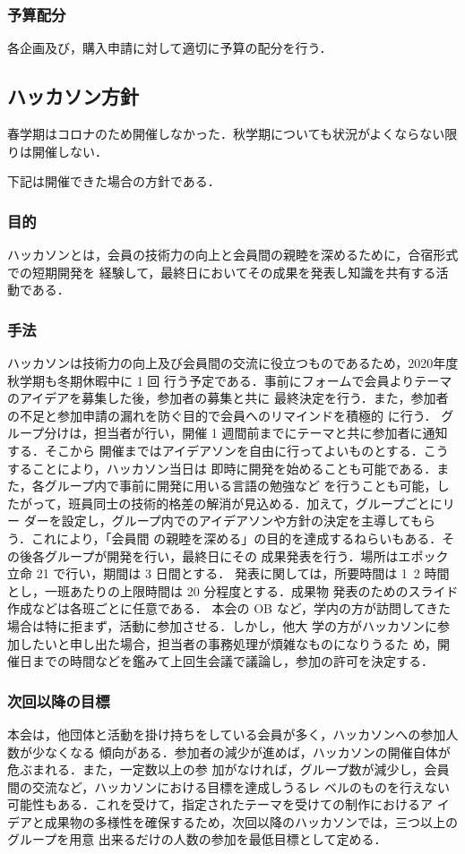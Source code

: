 \subsubsection*{予算配分}
各企画及び，購入申請に対して適切に予算の配分を行う．


\subsection*{ハッカソン方針}
春学期はコロナのため開催しなかった．秋学期についても状況がよくならない限りは開催しない．

下記は開催できた場合の方針である．

\subsubsection*{目的}
ハッカソンとは，会員の技術力の向上と会員間の親睦を深めるために，合宿形式での短期開発を
経験して，最終日においてその成果を発表し知識を共有する活動である．

\subsubsection*{手法}
ハッカソンは技術力の向上及び会員間の交流に役立つものであるため，2020年度秋学期も冬期休暇中に 1 回
行う予定である．事前にフォームで会員よりテーマのアイデアを募集した後，参加者の募集と共に
最終決定を行う．また，参加者の不足と参加申請の漏れを防ぐ目的で会員へのリマインドを積極的
に行う．
グループ分けは，担当者が行い，開催 1 週間前までにテーマと共に参加者に通知する．そこから
開催まではアイデアソンを自由に行ってよいものとする．こうすることにより，ハッカソン当日は
即時に開発を始めることも可能である．また，各グループ内で事前に開発に用いる言語の勉強など
を行うことも可能，したがって，班員同士の技術的格差の解消が見込める．加えて，グループごとにリー
ダーを設定し，グループ内でのアイデアソンや方針の決定を主導してもらう．これにより，「会員間
の親睦を深める」の目的を達成するねらいもある．その後各グループが開発を行い，最終日にその
成果発表を行う．場所はエポック立命 21 で行い，期間は 3 日間とする．
発表に関しては，所要時間は 1~2 時間とし，一班あたりの上限時間は 20 分程度とする．成果物
発表のためのスライド作成などは各班ごとに任意である．
本会の OB など，学内の方が訪問してきた場合は特に拒まず，活動に参加させる．しかし，他大
学の方がハッカソンに参加したいと申し出た場合，担当者の事務処理が煩雑なものになりうるた
め，開催日までの時間などを鑑みて上回生会議で議論し，参加の許可を決定する．


\subsubsection*{次回以降の目標}
本会は，他団体と活動を掛け持ちをしている会員が多く，ハッカソンへの参加人数が少なくなる
傾向がある．参加者の減少が進めば，ハッカソンの開催自体が危ぶまれる．また，一定数以上の参
加がなければ，グループ数が減少し，会員間の交流など，ハッカソンにおける目標を達成しうるレ
ベルのものを行えない可能性もある．これを受けて，指定されたテーマを受けての制作におけるア
イデアと成果物の多様性を確保するため，次回以降のハッカソンでは，三つ以上のグループを用意
出来るだけの人数の参加を最低目標として定める．



